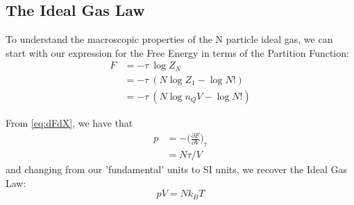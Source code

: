 \subsection{The Ideal Gas Law}
To understand the macroscopic properties of the N particle ideal gas, we can start with our expression for the Free Energy in terms of the Partition Function:
\begin{align}
F &= -\tau~\log Z_N \\
  &= -\tau~(N \log Z_1 - \log N!) \\
  &= -\tau~(N \log{n_Q V} - \log N!)
\end{align}

From \cref{eq:dFdX}, we have that
\begin{align}
p &= -\bigg(\frac{\partial F}{\partial V}\bigg)_\tau \\
  &= N \tau / V
\end{align}
and changing from our 'fundamental' units to SI units, we recover the Ideal Gas Law:
\begin{equation}
\boxed{p V = N k_B T}
\end{equation}



















